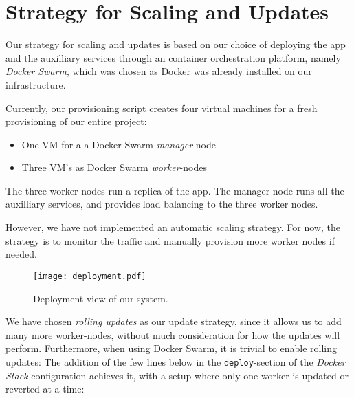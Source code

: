 \section{Strategy for Scaling and Updates}\label{sec:scaling}

Our strategy for scaling and updates is based on our choice of deploying the app and the auxilliary services through an container orchestration platform, namely \textit{Docker Swarm}, which was chosen as Docker was already installed on our infrastructure.

Currently, our provisioning script creates four virtual machines for a fresh provisioning of our entire project:

\begin{itemize}
	\item One VM for a a Docker Swarm \textit{manager}-node
	\item Three VM's as Docker Swarm \textit{worker}-nodes
\end{itemize}

The three worker nodes run a replica of the app.
The manager-node runs all the auxilliary services, and provides load balancing to the three worker nodes.

However, we have not implemented an automatic scaling strategy. For now, the strategy is to monitor the traffic and manually provision more worker nodes if needed.

\begin{figure}
	\begin{center}
		\texttt{[image: deployment.pdf]}
	\end{center}
	\caption{Deployment view of our system.}\label{fig:deployment}
\end{figure}

We have chosen \textit{rolling updates} as our update strategy, since it allows us to add many more worker-nodes, without much consideration for how the updates will perform.
Furthermore, when using Docker Swarm, it is trivial to enable rolling updates: The addition of the few lines below in the \texttt{deploy}-section of the \textit{Docker Stack} configuration achieves it, with a setup where only one worker is updated or reverted at a time:

